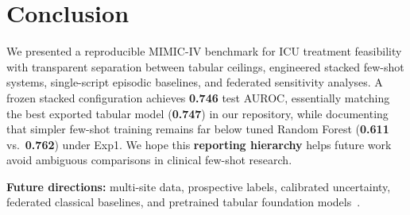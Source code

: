 \section{Conclusion}
\label{sec:conc}

We presented a reproducible MIMIC-IV benchmark for ICU treatment feasibility with transparent separation between tabular ceilings, engineered stacked few-shot systems, single-script episodic baselines, and federated sensitivity analyses. A frozen stacked configuration achieves \textbf{0.746} test AUROC, essentially matching the best exported tabular model (\textbf{0.747}) in our repository, while documenting that simpler few-shot training remains far below tuned Random Forest (\textbf{0.611} vs.\ \textbf{0.762}) under Exp1. We hope this \textbf{reporting hierarchy} helps future work avoid ambiguous comparisons in clinical few-shot research.

\textbf{Future directions:} multi-site data, prospective labels, calibrated uncertainty, federated classical baselines, and pretrained tabular foundation models~\citep{hegselmann2023tabllm}.
